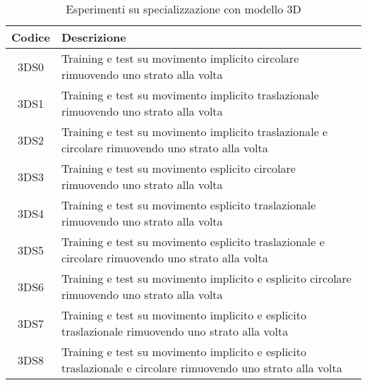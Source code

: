 \begin{table}[H]
	\begin{tabularx}{\textwidth}{|c|X|}
		\hline 
		\textbf{Codice} &
		\textbf{Descrizione} \\ 
		
		\hline 3DS0 &
		Training e test su movimento implicito circolare rimuovendo uno strato alla volta \\ 
		
		\hline 3DS1 &
		Training e test su movimento implicito traslazionale rimuovendo uno strato alla volta \\ 
		
		\hline 3DS2 & 
		Training e test su movimento implicito traslazionale e circolare rimuovendo uno strato alla volta \\
		
		\hline 3DS3 &
		Training e test su movimento esplicito circolare rimuovendo uno strato alla volta \\ 
		
		\hline 3DS4 &
		Training e test su movimento esplicito traslazionale rimuovendo uno strato alla volta \\ 
		
		\hline 3DS5 & 
		Training e test su movimento esplicito traslazionale e circolare rimuovendo uno strato alla volta \\ 
		
		\hline 3DS6 &
		Training e test su movimento implicito e esplicito circolare rimuovendo uno strato alla volta \\ 
		
		\hline 3DS7 &
		Training e test su movimento implicito e esplicito traslazionale rimuovendo uno strato alla volta \\ 
		
		\hline 3DS8 & 
		Training e test su movimento implicito e esplicito traslazionale e circolare rimuovendo uno strato alla volta \\ 
		\hline 
	\end{tabularx}
	\caption{Esperimenti su specializzazione con modello 3D}
	\label{esperimenti-specializzazione-3D}
\end{table}
